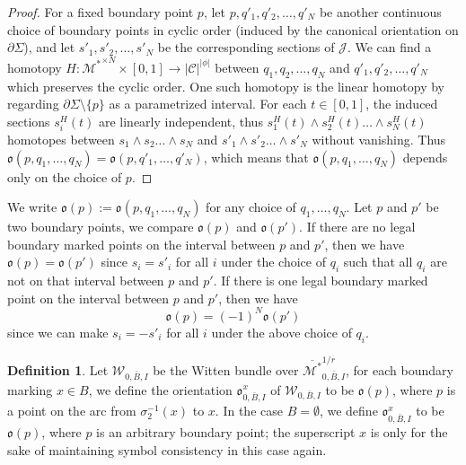 \documentclass[11pt,a4paper]{article}
\theoremstyle{definition}
\newtheorem{dfn}[dummy]{Definition}
\theoremstyle{remark}
\numberwithin{equation}{section}
\begin{document}
\begin{proof}
For a fixed boundary point $p$, let $p,q'_1,q'_2,\dots,q'_N$ be another continuous choice of boundary points in cyclic order (induced by the canonical orientation on $\partial \Sigma$), and let $s'_1,s'_2,\dots,s'_N$ be the corresponding sections of $\mathcal J$. We can find a  homotopy $H\colon {\mathcal M^{*}}^{\times N}\times [0,1]\to \lvert \mathcal C \rvert^{\lvert \phi\rvert}$  between $q_1,q_2,\dots,q_N$ and $q'_1,q'_2,\dots,q'_N$ which preserves the cyclic order. One such homotopy is the linear homotopy by regarding $\partial \Sigma\setminus\{p\}$ as a parametrized interval. For each $t\in [0,1]$, the induced sections $s^H_i(t)$ are linearly independent, thus $s^H_1(t)\wedge s^H_2(t)\dots \wedge s^H_N(t)$ homotopes between $s_1\wedge s_2\dots \wedge s_N$ and $s'_1\wedge s'_2\dots \wedge s'_N$ without vanishing. Thus $\mathfrak o(p,q_1,\dots,q_N)=\mathfrak o(p,q'_1,\dots,q'_N)$, which means that $\mathfrak o(p,q_1,\dots,q_N)$ depends only on the choice of $p$. 
\end{proof}
We write $\mathfrak o(p):=\mathfrak o(p,q_1,\dots,q_N)$ for any choice of $q_1,\dots,q_N$.
Let $p$ and $p'$ be two boundary points, we compare $\mathfrak o(p)$ and $\mathfrak o(p')$. If there are no legal boundary marked points on the interval between $p$ and $p'$, then we have $\mathfrak o(p)=\mathfrak o(p')$ since $s_i=s'_i$ for all $i$ under the choice of $q_i$ such that all $q_i$ are not on that interval between $p$ and $p'$. If there is one legal boundary marked point on the interval between $p$ and $p'$, then we have 
\begin{equation} \label{eq change of orientation of witten when cross a legal in g 0}
\mathfrak o(p)=(-1)^N\mathfrak o(p')
\end{equation}
since we can make $s_i=-s'_i$ for all $i$ under the above choice of $q_i$.

\begin{dfn}
    Let $\mathcal W_{0,\bar{B},I}$ be the Witten bundle over $\overline{\mathcal M^*}^{1/r}_{0,\bar{B},I}$, for each boundary marking $x\in B$, we define the orientation $\mathfrak o^{x}_{0,\bar{B},I}$ of $\mathcal W_{0,\bar{B},I}$ to be $\mathfrak o(p)$, where $p$ is a point on the arc from  $\sigma_2^{-1}(x)$ to $x$. In the case $B=\emptyset$, we define $\mathfrak o^{x}_{0,\bar{B},I}$ to be $\mathfrak o(p)$, where $p$ is an arbitrary boundary point; the superscript $x$ is only for the sake of maintaining symbol consistency in this case again.
\end{dfn}
\end{document}
